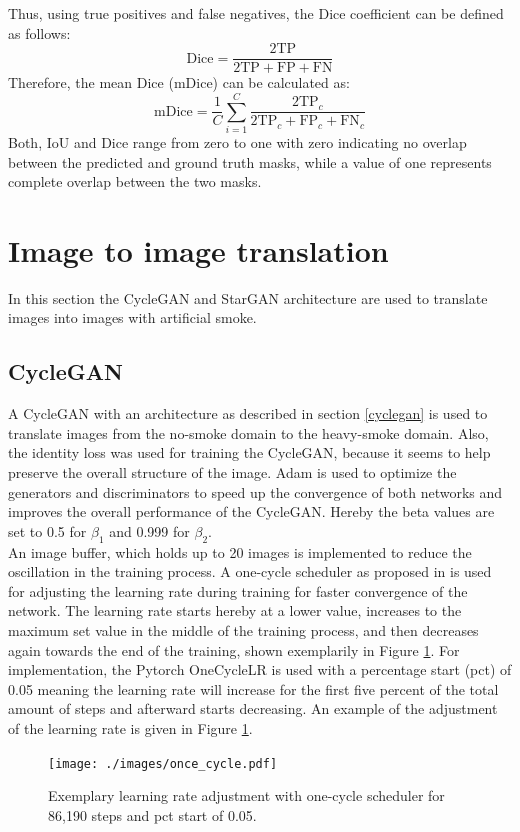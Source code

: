 Thus, using true positives and false negatives, the Dice coefficient can be defined as follows:
\begin{equation}
    \text{Dice} = \frac{2\text{TP}}{2\text{TP} + \text{FP} + \text{FN}}
\end{equation}
Therefore, the mean Dice (mDice) can be calculated as:
\begin{equation}
    \text{mDice} = \frac{1}{C}\sum_{i=1}^{C} \frac{2\text{TP}_c}{2\text{TP}_c + \text{FP}_c + \text{FN}_c}
\end{equation}
Both, IoU and Dice range from zero to one with zero indicating no overlap between the predicted and ground truth masks, while a value of one represents complete overlap between the two masks.

\section{Image to image translation}\label{i2i_trans}
In this section the CycleGAN and StarGAN architecture are used to translate images into images with artificial smoke.
\subsection{CycleGAN}\label{cyclegan_experiment}
A CycleGAN with an architecture as described in section \ref{cyclegan} is used to translate images from the no-smoke domain to the heavy-smoke domain.
Also, the identity loss was used for training the CycleGAN, because it seems to help preserve the overall structure of the image. 
Adam is used to optimize the generators and discriminators to speed up the convergence of both networks and improves the overall performance of the CycleGAN.
Hereby the beta values are set to 0.5 for $\beta_1$ and 0.999 for $\beta_2$.\\
An image buffer, which holds up to 20 images is implemented to reduce the oscillation in the training process.
A one-cycle scheduler as proposed in \cite{smith2018disciplined} is used for adjusting the learning rate during training for faster convergence of the network.
The learning rate starts hereby at a lower value, increases to the maximum set value in the middle of the training process, and then decreases again towards the end of the training, shown exemplarily in Figure \ref{one_cycle}.
For implementation, the Pytorch OneCycleLR is used with a percentage start (pct) of 0.05 meaning the learning rate will increase for the first five percent of the total amount of steps and afterward starts decreasing.
An example of the adjustment of the learning rate is given in Figure \ref{one_cycle}.
\begin{figure}[tb]
    \begin{center}
     \texttt{[image: ./images/once\_cycle.pdf]}
    \caption[One-cycle scheduler]{{Exemplary learning rate adjustment with one-cycle scheduler for 86,190 steps and pct start of 0.05.
    }\label{one_cycle}}
    \end{center}
\end{figure}
